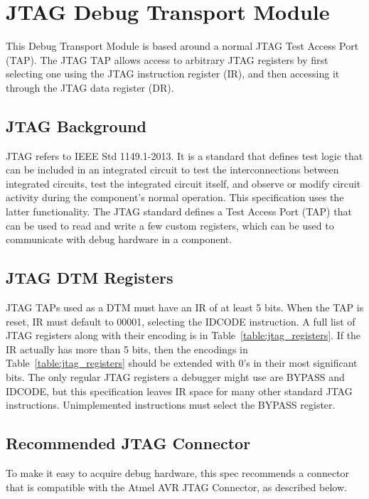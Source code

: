 \section{JTAG Debug Transport Module} \label{sec:jtagdtm}

This Debug Transport Module is based around a normal JTAG Test Access Port
(TAP).  The JTAG TAP allows access to arbitrary JTAG registers by first
selecting one using the JTAG instruction register (IR), and then accessing it
through the JTAG data register (DR).

\subsection{JTAG Background}

JTAG refers to IEEE Std 1149.1-2013. It is a standard that defines test logic
that can be included in an integrated circuit to test the interconnections
between integrated circuits, test the integrated circuit itself, and observe or
modify circuit activity during the component’s normal operation.
This specification uses the latter functionality.
The JTAG standard defines a Test Access Port (TAP) that
can be used to read and write a few custom registers, which can be used to
communicate with debug hardware in a component.

\subsection{JTAG DTM Registers}

JTAG TAPs used as a DTM must have an IR of at least 5 bits.
When the TAP is reset, IR must default to
00001, selecting the IDCODE instruction. A full list of JTAG registers along
with their encoding is in Table~\ref{table:jtag_registers}.
If the IR actually has more than 5 bits, then the encodings in
Table~\ref{table:jtag_registers} should be extended with 0's in their
most significant bits.
The only regular JTAG registers a debugger might use are BYPASS and IDCODE, but this
specification leaves IR space for many other standard JTAG instructions.
Unimplemented instructions must select the BYPASS register.



\subsection{Recommended JTAG Connector}

To make it easy to
acquire debug hardware, this spec recommends a connector that is compatible
with the Atmel AVR JTAG Connector, as described below.

